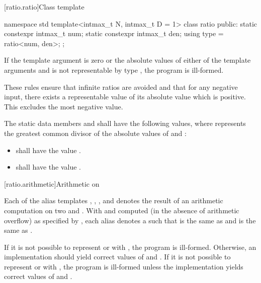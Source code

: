 [ratio.ratio]{Class template }

%
\begin{codeblock}
namespace std {
  template<intmax_t N, intmax_t D = 1> class ratio {
  public:
    static constexpr intmax_t num;
    static constexpr intmax_t den;
    using type = ratio<num, den>;
  };
}
\end{codeblock}

\pnum
{}%
If the template argument  is zero or the absolute values of either of the
template arguments  and  is not representable by type
, the program is ill-formed.
\begin{note}
These rules ensure that infinite
ratios are avoided and that for any negative input, there exists a representable value
of its absolute value which is positive.
This excludes the most negative value.
\end{note}

\pnum
The static data members  and  shall have the following values,
where  represents the greatest common divisor of the absolute values of
 and :

\begin{itemize}
\item {} shall have the value .
\item {} shall have the value .
\end{itemize}

[ratio.arithmetic]{Arithmetic on }

\pnum
Each of the alias templates , , ,
and  denotes the result of an arithmetic computation on two
  and . With  and  computed (in the
absence of arithmetic overflow) as specified by , each alias
denotes a  such that  is the same as  and
 is the same as .

\pnum
If it is not possible to represent  or  with , the program is
ill-formed. Otherwise, an implementation should yield correct values of  and
. If it is not possible to represent  or  with , the
program is ill-formed unless the implementation yields correct values of  and
.

